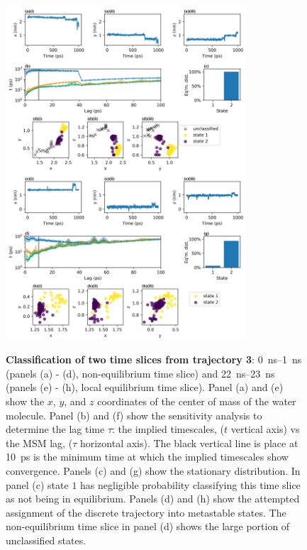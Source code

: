 \begin{figure}[p]
    \centering
    \caption{\textbf{Classification of two time slices from trajectory 3}: \SIrange{0}{1}{\nano\second} (panels (a) - (d), non-equilibrium time slice) and \SIrange{22}{23}{\nano\second} (panels (e) - (h), local equilibrium time slice). Panel (a) and (e) show the $x$, $y$, and $z$ coordinates of the center of mass of the water molecule. Panel (b) and (f) show the sensitivity analysis to determine the lag time $\tau$: the implied timescales, ($t$ vertical axis) vs the MSM lag, ($\tau$ horizontal axis). The black vertical line is place at \SI{10}{\pico\second} is the minimum time at which the implied timescales show convergence. Panels (c) and (g) show the stationary distribution. In panel (c) state $1$ has negligible probability classifying this time slice as not being in equilibrium. Panels (d) and (h) show the attempted assignment of the discrete trajectory into metastable states. The non-equilibrium time slice in panel (d) shows the large portion of unclassified states.}
    \includegraphics[width=0.8\textwidth]{chapters/water_hopping/figures/Fig_S11.png}
    \label{fig:wat_msm_classification}
\end{figure}

